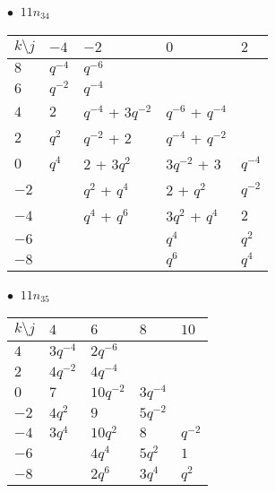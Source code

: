 %
\begin{minipage}{\linewidth}
$\bullet\ $ $11n_{34}$ \vspace{0.5em} \\
\begin{tabular}{l|llll}
$k \setminus j$ & $-4$ & $-2$ & $0$ & $2$ \\
\hline
$8$ & $q^{-4}$ & $q^{-6}$ &  &  \\
$6$ & $q^{-2}$ & $q^{-4}$ &  &  \\
$4$ & $2$ & $q^{-4}$ + $3q^{-2}$ & $q^{-6}$ + $q^{-4}$ &  \\
$2$ & $q^{2}$ & $q^{-2}$ + $2$ & $q^{-4}$ + $q^{-2}$ &  \\
$0$ & $q^{4}$ & $2$ + $3q^{2}$ & $3q^{-2}$ + $3$ & $q^{-4}$ \\
$-2$ &  & $q^{2}$ + $q^{4}$ & $2$ + $q^{2}$ & $q^{-2}$ \\
$-4$ &  & $q^{4}$ + $q^{6}$ & $3q^{2}$ + $q^{4}$ & $2$ \\
$-6$ &  &  & $q^{4}$ & $q^{2}$ \\
$-8$ &  &  & $q^{6}$ & $q^{4}$ \\
\end{tabular}
\vspace{2em}
\end{minipage}
%
\begin{minipage}{\linewidth}
$\bullet\ $ $11n_{35}$ \vspace{0.5em} \\
\begin{tabular}{l|llll}
$k \setminus j$ & $4$ & $6$ & $8$ & $10$ \\
\hline
$4$ & $3q^{-4}$ & $2q^{-6}$ &  &  \\
$2$ & $4q^{-2}$ & $4q^{-4}$ &  &  \\
$0$ & $7$ & $10q^{-2}$ & $3q^{-4}$ &  \\
$-2$ & $4q^{2}$ & $9$ & $5q^{-2}$ &  \\
$-4$ & $3q^{4}$ & $10q^{2}$ & $8$ & $q^{-2}$ \\
$-6$ &  & $4q^{4}$ & $5q^{2}$ & $1$ \\
$-8$ &  & $2q^{6}$ & $3q^{4}$ & $q^{2}$ \\
\end{tabular}
\vspace{2em}
\end{minipage}
%
